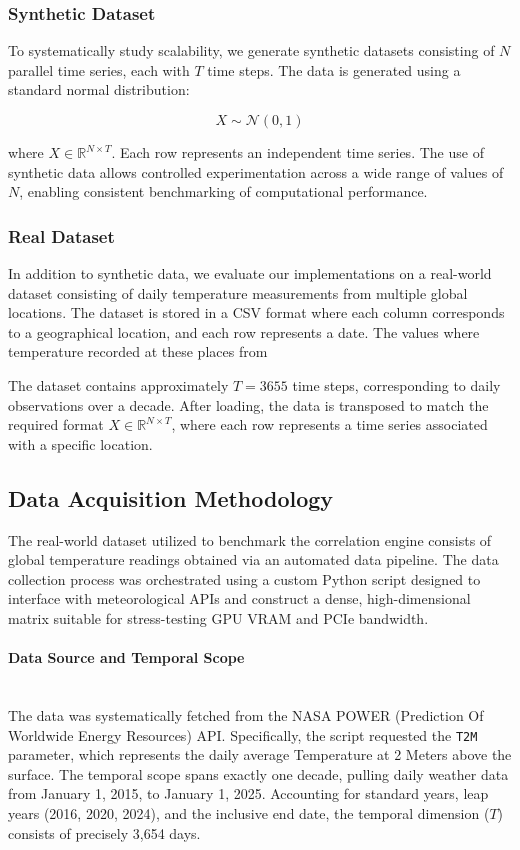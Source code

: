 \subsubsection{Synthetic Dataset}

To systematically study scalability, we generate synthetic datasets consisting of $N$ parallel time series, each with $T$ time steps. The data is generated using a standard normal distribution:

\begin{equation}
X \sim \mathcal{N}(0,1)
\end{equation}

where $X \in \mathbb{R}^{N \times T}$. Each row represents an independent time series. The use of synthetic data allows controlled experimentation across a wide range of values of $N$, enabling consistent benchmarking of computational performance.

\subsubsection{Real Dataset}

In addition to synthetic data, we evaluate our implementations on a real-world dataset consisting of daily temperature measurements from multiple global locations. The dataset is stored in a CSV format where each column corresponds to a geographical location, and each row represents a date. The values where temperature recorded at these places from 

The dataset contains approximately $T = 3655$ time steps, corresponding to daily observations over a decade. After loading, the data is transposed to match the required format $X \in \mathbb{R}^{N \times T}$, where each row represents a time series associated with a specific location.
\subsection{Data Acquisition Methodology}

The real-world dataset utilized to benchmark the correlation engine consists of global temperature readings obtained via an automated data pipeline. The data collection process was orchestrated using a custom Python script designed to interface with meteorological APIs and construct a dense, high-dimensional matrix suitable for stress-testing GPU VRAM and PCIe bandwidth.

\paragraph{Data Source and Temporal Scope} \mbox{} \\
The data was systematically fetched from the NASA POWER (Prediction Of Worldwide Energy Resources) API. Specifically, the script requested the \texttt{T2M} parameter, which represents the daily average Temperature at 2 Meters above the surface. The temporal scope spans exactly one decade, pulling daily weather data from January 1, 2015, to January 1, 2025. Accounting for standard years, leap years (2016, 2020, 2024), and the inclusive end date, the temporal dimension ($T$) consists of precisely 3,654 days.

